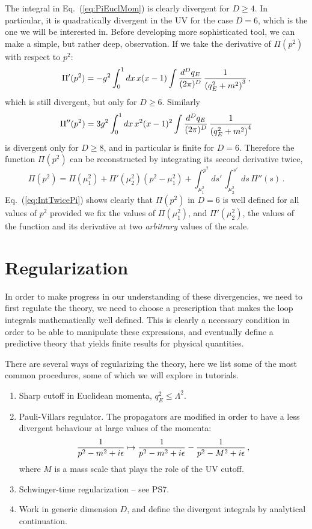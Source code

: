 The integral in Eq.~(\ref{eq:PiEuclMom}) is clearly divergent for
$D\geq 4$. In particular, it is quadratically divergent in the UV for
the case $D=6$, which is the one we will be interested in. Before
developing more sophisticated tool, we can make a simple, but rather
deep, observation. If we take the derivative of $\Pi(p^2)$ with
respect to $p^2$:
\begin{equation}
  \label{eq:PiPrimeInt}
  \Pi'(p^2) = -g^2 \int_0^1dx\, x(x-1) \int \frac{d^Dq_E}{(2\pi)^D}\,
  \frac{1}{\left(q_E^2+m^2\right)^3}\, ,
\end{equation}
which is still divergent, but only for $D\geq 6$. Similarly
\begin{equation}
  \label{eq:PiDoublePrimeInt}
  \Pi''(p^2) = 3g^2 \int_0^1dx\, x^2(x-1)^2 \int \frac{d^Dq_E}{(2\pi)^D}\,
  \frac{1}{\left(q_E^2+m^2\right)^4}
\end{equation}
is divergent only for $D\geq 8$, and in particular is finite for
$D=6$. Therefore the function $\Pi(p^2)$ can be reconstructed by
integrating its second derivative twice,
\begin{equation}
  \label{eq:IntTwicePi}
  \Pi(p^2) = \Pi(\mu_1^2) + \Pi'(\mu_2^2) \left(p^2-\mu_1^2\right) +
  \int_{\mu_1^2}^{p^2} ds'\, \int_{\mu_2^2}^{s'} ds\, \Pi''(s)\, .  
\end{equation}
Eq.~(\ref{eq:IntTwicePi}) shows clearly that $\Pi(p^2)$ in $D=6$ is well
defined for all values of $p^2$ provided we fix the values of
$\Pi(\mu_1^2)$, and $\Pi'(\mu_2^2)$, \ie the values of the function
and its derivative at two {\em arbitrary} values of the scale.

\section{Regularization}
\label{sec:regularization}

In order to make progress in our understanding of these divergencies,
we need to first regulate the theory, \ie we need to choose a
prescription that makes the loop integrals mathematically well
defined. This is clearly a necessary condition in order to be able to
manipulate these expressions, and eventually define a predictive
theory that yields finite results for physical quantities.

There are several ways of regularizing the theory, here we list some
of the most common procedures, some of which we will explore in
tutorials.
\begin{enumerate}
\item Sharp cutoff in Euclidean momenta, $q_E^2\leq \Lambda^2$.
\item Pauli-Villars regulator. The propagators are modified in order to
  have a less divergent behaviour at large values of the momenta:
  \begin{equation}
    \label{eq:PVReg}
    \frac{1}{p^2-m^2+i\epsilon} \mapsto \frac{1}{p^2-m^2+i\epsilon} - \frac{1}{p^2-M^2+i\epsilon}\, ,
  \end{equation}
  where $M$ is a mass scale that plays the role of the UV cutoff.
\item Schwinger-time regularization -- see PS7.
\item Work in generic dimension $D$, and define the divergent
  integrals by analytical continuation. 
\end{enumerate}

